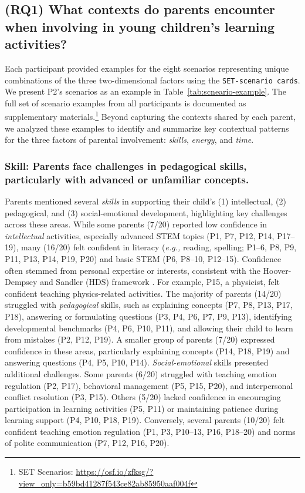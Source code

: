 \subsection{(RQ1) What contexts do parents encounter when involving in young children's learning activities?}

Each participant provided examples for the eight scenarios representing unique combinations of the three two-dimensional factors using the \texttt{SET-scenario cards}. We present P2's scenarios as an example in Table~\ref{tab:scneario-example}. The full set of scenario examples from all participants is documented as supplementary materials.\footnote{SET Scenarios: \url{https://osf.io/zfksg/?view_only=b59bd41287f543ce82ab85950aaf004f}} Beyond capturing the contexts shared by each parent, we analyzed these examples to identify and summarize key contextual patterns for the three factors of parental involvement: \textit{skills}, \textit{energy}, and \textit{time}.

\subsubsection{\textbf{Skill:} Parents face challenges in pedagogical skills, particularly with advanced or unfamiliar concepts.}
Parents mentioned several \textit{skills} in supporting their child's (1) intellectual, (2) pedagogical, and (3) social-emotional development, highlighting key challenges across these areas. While some parents (7/20) reported low confidence in \textit{intellectual} activities, especially advanced STEM topics (P1, P7, P12, P14, P17–19), many (16/20) felt confident in literacy (\textit{e.g.,} reading, spelling; P1–6, P8, P9, P11, P13, P14, P19, P20) and basic STEM (P6, P8–10, P12–15). Confidence often stemmed from personal expertise or interests, consistent with the Hoover-Dempsey and Sandler (HDS) framework \cite{green2007parents}. For example, P15, a physicist, felt confident teaching physics-related activities. The majority of parents (14/20) struggled with \textit{pedagogical} skills, such as explaining concepts (P7, P8, P13, P17, P18), answering or formulating questions (P3, P4, P6, P7, P9, P13), identifying developmental benchmarks (P4, P6, P10, P11), and allowing their child to learn from mistakes (P2, P12, P19). A smaller group of parents (7/20) expressed confidence in these areas, particularly explaining concepts (P14, P18, P19) and answering questions (P4, P5, P10, P14). \textit{Social-emotional} skills presented additional challenges. Some parents (6/20) struggled with teaching emotion regulation (P2, P17), behavioral management (P5, P15, P20), and interpersonal conflict resolution (P3, P15). Others (5/20) lacked confidence in encouraging participation in learning activities (P5, P11) or maintaining patience during learning support (P4, P10, P18, P19). Conversely, several parents (10/20) felt confident teaching emotion regulation (P1, P3, P10–13, P16, P18–20) and norms of polite communication (P7, P12, P16, P20).

